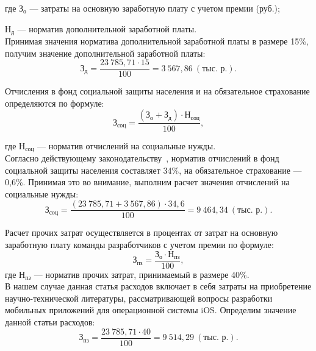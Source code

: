 \noindent где
\( \text{З}_{\text{о}} \)
--- затраты на основную заработную плату с учетом премии (руб.); \par
\noindent \hspace{6.5mm} \( \text{Н}_{\text{д}} \)
--- норматив дополнительной заработной платы. \\

Принимая значения норматива дополнительной заработной платы в размере 15\%,
получим значение дополнительной заработной платы:
\begin{equation}
  \text{З}_{\text{д}} =
  \dfrac{23 \: 785{,}71 \cdot 15}{100} = 3 \: 567{,}86 \: (\text{тыс.~р.}).
\end{equation}

Отчисления в фонд социальной защиты населения и на обязательное страхование
определяются по формуле:
\begin{equation}
  \text{З}_{\text{соц}} =
  \dfrac{(\text{З}_{\text{о}} + \text{З}_{\text{д}}) \cdot \text{Н}_{\text{соц}}}{100},
\end{equation}

\noindent где
\( \text{Н}_{\text{соц}} \) --- норматив отчислений на социальные нужды. \\

Согласно действующему законодательству~\cite{law_social_royalties},
норматив отчислений в фонд социальной защиты населения составляет 34\%,
на обязательное страхование --- 0,6\%. Принимая это во внимание,
выполним расчет значения отчислений на социальные нужды:
\begin{equation}
  \text{З}_{\text{соц}} =
  \dfrac{(23 \: 785{,}71 + 3 \: 567{,}86) \cdot 34{,}6}{100} = 9 \: 464{,}34 \: (\text{тыс.~р.}).
\end{equation}

Расчет прочих затрат осуществляется в процентах от затрат на основную
заработную плату команды разработчиков с учетом премии по формуле:
\begin{equation}
  \text{З}_{\text{пз}} =
  \dfrac{\text{З}_{\text{о}} \cdot \text{Н}_{\text{пз}}}{100},
\end{equation}
\noindent где
\( \text{Н}_{\text{пз}} \)
--- норматив прочих затрат, принимаемый в размере 40\%. \\

В нашем случае данная статья расходов включает в себя затраты
на приобретение научно-технической литературы, рассматривающей вопросы
разработки мобильных приложений для операционной системы iOS.
Определим значение данной статьи расходов:
\begin{equation}
  \text{З}_{\text{пз}} =
  \dfrac{23 \: 785{,}71 \cdot 40}{100} = 9 \: 514{,}29 \: (\text{тыс.~р.}).
\end{equation}

